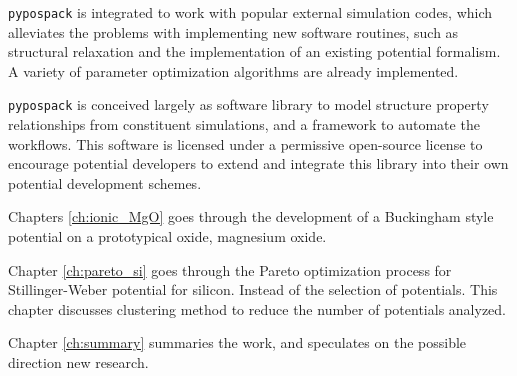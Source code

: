 \verb|pypospack| is integrated to work with popular external simulation codes, which alleviates the problems with implementing new software routines, such as structural relaxation and the implementation of an existing potential formalism.  A variety of parameter optimization algorithms are already implemented.

\verb|pypospack| is conceived largely as software library to model structure property relationships from constituent simulations, and a framework to automate the workflows.  This software is licensed under a permissive open-source license to encourage potential developers to extend and integrate this library into their own potential development schemes.

Chapters \ref{ch:ionic_MgO} goes through the development of a Buckingham style potential on a prototypical oxide, magnesium oxide.

Chapter \ref{ch:pareto_si} goes through the Pareto optimization process for Stillinger-Weber potential for silicon.  Instead of the selection of potentials.  This chapter discusses clustering method to reduce the number of potentials analyzed.

Chapter \ref{ch:summary} summaries the work, and speculates on the possible direction new research.
